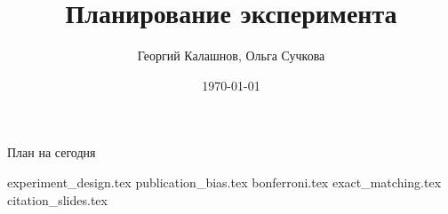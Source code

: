 \documentclass[handout,12pt]{beamer}
\title{Планирование эксперимента}
\author[Георгий Калашнов, Ольга Сучкова]{Георгий Калашнов, Ольга Сучкова}
\date{\today}
\begin{document}
\begin{frame}
  \titlepage
\end{frame}


\begin{frame}{План на сегодня} 
\tableofcontents
\end{frame}


{experiment_design.tex}
{publication_bias.tex}
{bonferroni.tex}
{exact_matching.tex}
{citation_slides.tex}
\end{document}
